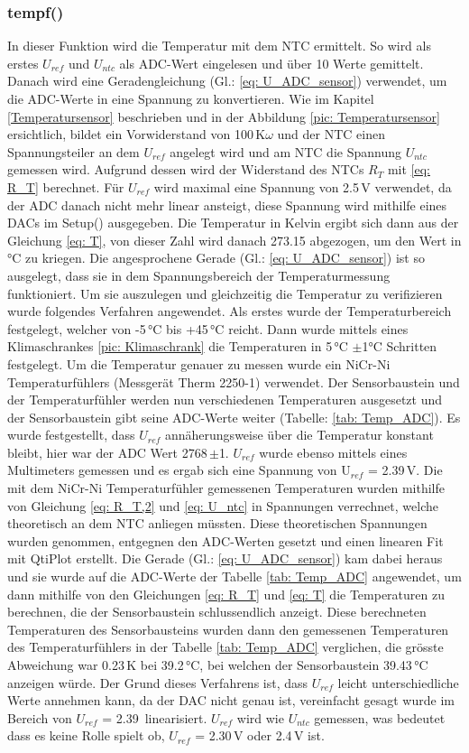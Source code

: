 \subsubsection{tempf()} \label{tempf}
In dieser Funktion wird die Temperatur mit dem NTC ermittelt. So wird als erstes $U_{ref}$ und $U_{ntc}$ als ADC-Wert eingelesen und über 10 Werte gemittelt. Danach wird eine Geradengleichung (Gl.: \ref{eq: U_ADC_sensor}) verwendet, um die ADC-Werte in eine Spannung zu konvertieren. Wie im Kapitel \ref{Temperatursensor} beschrieben und in der Abbildung \ref{pic: Temperatursensor} ersichtlich, bildet ein Vorwiderstand von 100\,K$\omega$ und der NTC einen Spannungsteiler an dem $U_{ref}$ angelegt wird und am NTC die Spannung $U_{ntc}$ gemessen wird. Aufgrund dessen wird der Widerstand des NTCs $R_T$ mit \ref{eq: R_T} berechnet. Für $U_{ref}$ wird maximal eine Spannung von 2.5\,V verwendet, da der ADC danach nicht mehr linear ansteigt, diese Spannung wird mithilfe eines DACs im Setup() ausgegeben. Die Temperatur in Kelvin ergibt sich dann aus der Gleichung \ref{eq: T}, von dieser Zahl wird danach 273.15 abgezogen, um den Wert in °C zu kriegen. Die angesprochene Gerade (Gl.: \ref{eq: U_ADC_sensor}) ist so ausgelegt, dass sie in dem Spannungsbereich der Temperaturmessung funktioniert. Um sie auszulegen und gleichzeitig die Temperatur zu verifizieren wurde folgendes Verfahren angewendet. Als erstes wurde der Temperaturbereich festgelegt, welcher von -5\,°C bis +45\,°C reicht. Dann wurde mittels eines Klimaschrankes \ref{pic: Klimaschrank} die Temperaturen in 5\,°C $\pm$1°C Schritten festgelegt. Um die Temperatur genauer zu messen wurde ein NiCr-Ni Temperaturfühlers (Messgerät Therm 2250-1) verwendet. Der Sensorbaustein und der Temperaturfühler werden nun verschiedenen Temperaturen ausgesetzt und der Sensorbaustein gibt seine ADC-Werte weiter (Tabelle: \ref{tab: Temp_ADC}). Es wurde festgestellt, dass $U_{ref}$ annäherungsweise über die Temperatur konstant bleibt, hier war der ADC Wert 2768\,$\pm$1. $U_{ref}$ wurde ebenso mittels eines Multimeters gemessen und es ergab sich eine Spannung von U$_{ref}$ = 2.39\,V. Die mit dem NiCr-Ni Temperaturfühler gemessenen Temperaturen wurden mithilfe von Gleichung \ref{eq: R_T,2} und \ref{eq: U_ntc} in Spannungen verrechnet, welche theoretisch an dem NTC anliegen müssten. Diese theoretischen Spannungen wurden genommen, entgegnen den ADC-Werten gesetzt und einen linearen Fit mit QtiPlot erstellt. Die Gerade (Gl.: \ref{eq: U_ADC_sensor}) kam dabei heraus und sie wurde auf die ADC-Werte der Tabelle \ref{tab: Temp_ADC} angewendet, um dann mithilfe von den Gleichungen \ref{eq: R_T} und \ref{eq: T} die Temperaturen zu berechnen, die der Sensorbaustein schlussendlich anzeigt. Diese berechneten Temperaturen des Sensorbausteins wurden dann den gemessenen Temperaturen des Temperaturfühlers in der Tabelle \ref{tab: Temp_ADC} verglichen, die grösste Abweichung war 0.23\,K bei 39.2\,°C, bei welchen der Sensorbaustein 39.43\,°C anzeigen würde. Der Grund dieses Verfahrens ist, dass $U_{ref}$ leicht unterschiedliche Werte annehmen kann, da der DAC nicht genau ist, vereinfacht gesagt wurde im Bereich von $U_{ref}$ = 2.39\, linearisiert. $U_{ref}$ wird wie $U_{ntc}$ gemessen, was bedeutet dass es keine Rolle spielt ob, $U_{ref}$ = 2.30\,V oder 2.4\,V ist.

